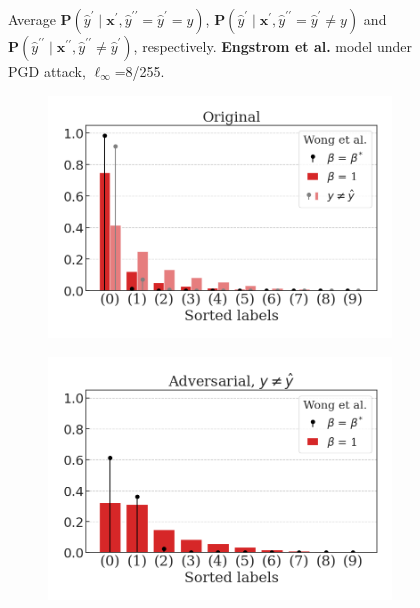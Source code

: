 \begin{figure}[H]
    \caption{Average $\mathbf{P}(\hat{y}^\prime \mid \mathbf{x}^\prime, \hat{y}^{\prime \prime} = \hat{y}^\prime = y)$,
    $\mathbf{P}(\hat{y}^\prime \mid \mathbf{x}^\prime, \hat{y}^{\prime \prime} = \hat{y}^\prime \neq y)$ and
    $\mathbf{P}(\hat{y}^{\prime \prime} \mid \mathbf{x}^{\prime \prime}, \hat{y}^{\prime \prime} \neq \hat{y}^\prime)$,
    respectively. {\color{tab:blue} \textbf{Engstrom et al.}} model under PGD attack, $\ell_\infty$=8/255.}
    \label{fig:pgd_distributions_engstrom}
\end{figure}
\begin{figure}[H]
    \centering
    \begin{subfigure}[b]{0.45\textwidth}
        \centering
        \includegraphics[width=\textwidth]{img/results_discussion/adversarial/Wong2020Fast_orig_PGD_0.0314.png}
    \end{subfigure}
    \hfill
    \begin{subfigure}[b]{0.45\textwidth}
        \centering
        \includegraphics[width=\textwidth]{img/results_discussion/adversarial/Wong2020Fast_adv_PGD_0.0314.png}
    \end{subfigure}


\end{figure}
